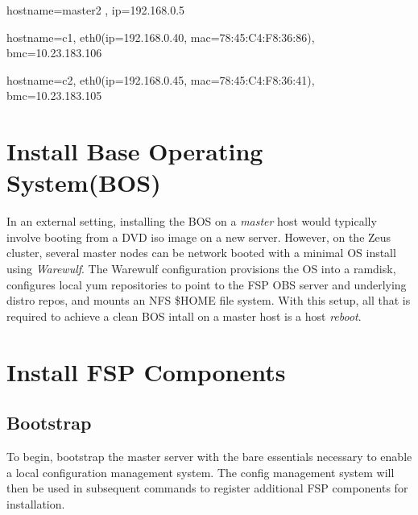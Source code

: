 \documentclass[letterpaper]{article}
\begin{document}
\begin{itemize*}
\item hostname=master2 , ip=192.168.0.5
\item hostname=c1, eth0(ip=192.168.0.40, mac=78:45:C4:F8:36:86), bmc=10.23.183.106
\item hostname=c2, eth0(ip=192.168.0.45, mac=78:45:C4:F8:36:41), bmc=10.23.183.105
\end{itemize*}




\section{Install Base Operating System(BOS)}

In an external setting, installing the BOS on a {\em master} host would
typically involve booting from a DVD iso image on a new server.  However, on
the Zeus cluster, several master nodes can be network booted with a minimal OS
install using {\em Warewulf}. The Warewulf configuration provisions the OS into
a ramdisk, configures local yum repositories to point to the FSP OBS server and
underlying distro repos, and mounts an NFS \$HOME file system. With this setup,
all that is required to achieve a clean BOS intall on a master host is a host
{\em reboot}. 

\section{Install FSP Components}

\subsection{Bootstrap}

To begin, bootstrap the master server with the bare essentials necessary to
enable a local configuration management system. The config management system
will then be used in subsequent commands to register additional FSP components
for installation.
\end{document}
